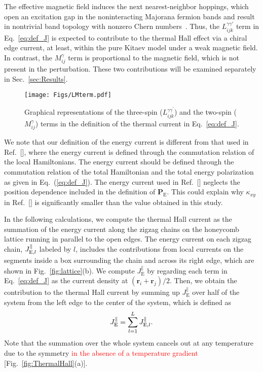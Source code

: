 \documentclass[twocolumn,superscriptaddress,showpacs, longbibliography, aps, prx]{revtex4-2}
\def\vec#1{\boldsymbol #1}
\newcommand{\red}[1]{\textcolor{red}{#1}}
\begin{document}
The effective magnetic field induces the next nearest-neighbor hoppings, which open an excitation gap in the noninteracting Majorana fermion bands and result in nontrivial band topology with nonzero Chern numbers~\cite{Kitaev2006}.
Thus, the $L_{ijk}^{\gamma\gamma'}$ term in Eq.~\eqref{eq:def_J} is expected to contribute to the thermal Hall effect via a chiral edge current, at least, within the pure Kitaev model under a weak magnetic field. 
In contrast, the $M_{ij}^{\gamma}$ term is proportional to the magnetic field, which is not present in the perturbation. 
These two contributions will be examined separately in Sec.~\ref{sec:Results}.

\begin{figure}
  \begin{center}
    \texttt{[image: Figs/LMterm.pdf]}    
  \end{center}
  \caption{
  Graphical representations of the three-spin ($L_{ijk}^{\gamma\gamma^\prime}$) and the two-spin ($M_{ij}^\gamma$) terms in the definition of the thermal current in Eq.~\eqref{eq:def_J}.
  }
  \label{fig:LM_term}
\end{figure}


We note that our definition of the energy current is different from that used in Ref.~[], where the energy current is defined through the commutation relation of the local Hamiltonians.
The energy current should be defined through the commutation relation of the total Hamiltonian and the total energy polarization as given in Eq.~(\ref{eq:def_J}). 
The energy current used in Ref.~[] neglects the position dependence included in the definition of $\vec{P}_{\mathrm{E}}$.
This could explain why $\kappa_{xy}$ in Ref.~[] is significantly smaller than the value obtained in this study.

In the following calculations, we compute the thermal Hall current as the summation of the energy current along the zigzag chains on the honeycomb lattice running in parallel to the open edges. 
The energy current on each zigzag chain, $J_{{\rm E},l}^\parallel$ labeled by $l$, includes the contributions from local currents on the segments inside a box surrounding the chain and across its right edge, which are shown in Fig.~\ref{fig:lattice}(b). 
We compute {$J_{\mathrm{E}}^{\parallel}$} by regarding each term in Eq.~\eqref{eq:def_J} as the current density at $(\bm{r}_i + \bm{r}_j)/2$. Then, we obtain the contribution to the thermal Hall current by summing up $J_{\mathrm{E}}^{\parallel}$ over half of the system from the left edge to the center of the system, which is defined as
\begin{align}
J_{\rm E}^\parallel=\sum_{l=1}^{L}J_{{\rm E},l}^\parallel.
\label{eq:JE}
\end{align} 
Note that the summation over the whole system cancels out at any temperature due to the symmetry \red{in the absence of a temperature gradient} [Fig.~\ref{fig:ThermalHall}(a)]. 
\end{document}
